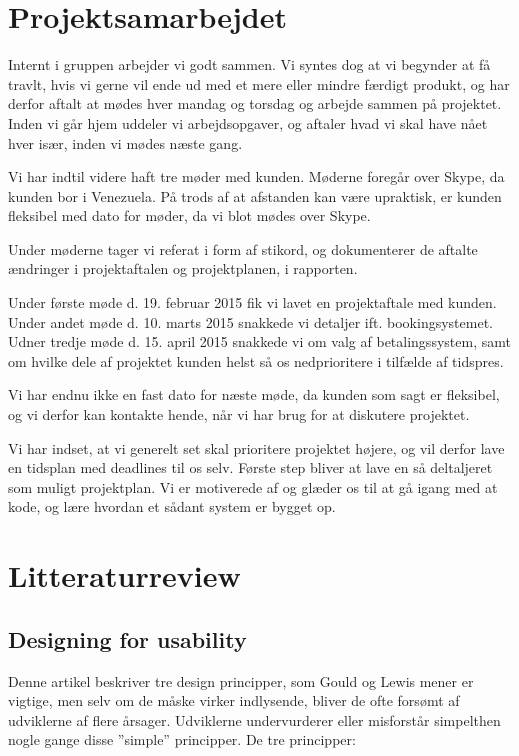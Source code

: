 \documentclass[12pt,a4paper]{article}
\begin{document}
\section{Projektsamarbejdet}
Internt i gruppen arbejder vi godt sammen. Vi syntes dog at vi begynder at få travlt, hvis vi gerne vil ende ud med et mere eller mindre færdigt produkt, og har derfor aftalt at mødes hver mandag og torsdag og arbejde sammen på projektet. Inden vi går hjem uddeler vi arbejdsopgaver, og aftaler hvad vi skal have nået hver især, inden vi mødes næste gang. 

Vi har indtil videre haft tre møder med kunden. Møderne foregår over Skype, da kunden bor i Venezuela. På trods af at afstanden kan være upraktisk, er kunden fleksibel med dato for møder, da vi blot mødes over Skype.

Under møderne tager vi referat i form af stikord, og dokumenterer de aftalte ændringer i projektaftalen og projektplanen, i rapporten. 

Under første møde d. 19. februar 2015 fik vi lavet en projektaftale med kunden.
Under andet møde d. 10. marts 2015 snakkede vi detaljer ift. bookingsystemet.
Udner tredje møde d. 15. april 2015 snakkede vi om valg af betalingssystem, samt om hvilke dele af projektet kunden helst så os nedprioritere i tilfælde af tidspres.

Vi har endnu ikke en fast dato for næste møde, da kunden som sagt er fleksibel, og vi derfor kan kontakte hende, når vi har brug for at diskutere projektet.

Vi har indset, at vi generelt set skal prioritere projektet højere, og vil derfor lave en tidsplan med deadlines til os selv. Første step bliver at lave en så deltaljeret som muligt projektplan.
Vi er motiverede af og glæder os til at gå igang med at kode, og lære hvordan et sådant system er bygget op. 
\newpage
\section{Litteraturreview}
\subsection{Designing for usability}
Denne artikel beskriver tre design principper, som Gould og Lewis mener er vigtige, men selv om de måske virker indlysende, bliver de ofte forsømt af udviklerne af flere årsager. Udviklerne undervurderer eller misforstår simpelthen nogle gange disse ”simple” principper. De tre principper: 
\end{document}
